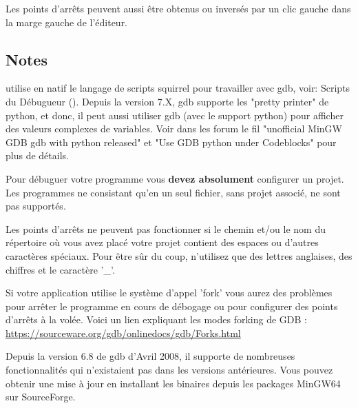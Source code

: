 Les points d'arrêts peuvent aussi être obtenus ou inversés par un clic gauche dans la marge gauche de l'éditeur. 

\subsection{Notes}

\codeblocks utilise en natif le langage de scripts squirrel pour travailler avec gdb, voir: Scripts du Débugueur (). Depuis la version 7.X, gdb supporte les "pretty printer" de python, et donc, il peut aussi utiliser gdb (avec le support python) pour afficher des valeurs complexes de variables. Voir dans les forum le fil "unofficial MinGW GDB gdb with python released" et "Use GDB python under Codeblocks" pour plus de détails.


Pour débuguer votre programme vous \textbf{devez absolument} configurer un projet. Les programmes ne consistant qu'en un seul fichier, sans projet associé, ne sont pas supportés.


Les points d'arrêts ne peuvent pas fonctionner si le chemin et/ou le nom du répertoire où vous avez placé votre projet contient des espaces ou d'autres caractères spéciaux. Pour être sûr du coup, n'utilisez que des lettres anglaises, des chiffres et le caractère '\_'.


Si votre application utilise le système d'appel 'fork' vous aurez des problèmes pour arrêter le programme en cours de débogage ou pour configurer des points d'arrêts à la volée. Voici un lien expliquant les modes forking de GDB : \url{https://sourceware.org/gdb/onlinedocs/gdb/Forks.html}


Depuis la version 6.8 de gdb d'Avril 2008, il supporte de nombreuses fonctionnalités qui n'existaient pas dans les versions antérieures. Vous pouvez obtenir une mise à jour en installant les binaires depuis les packages MinGW64 sur SourceForge.


